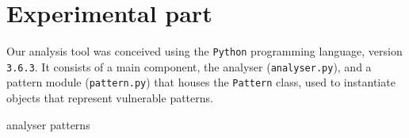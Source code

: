 \section*{Experimental part}
\label{sec:expr}

Our analysis tool was conceived using the \verb|Python| programming language,
version \verb|3.6.3|. It consists of a main component, the analyser
(\verb|analyser.py|), and a pattern module (\verb|pattern.py|) that houses the
\verb|Pattern| class, used to instantiate objects that represent vulnerable
patterns.

{analyser}
{patterns}
